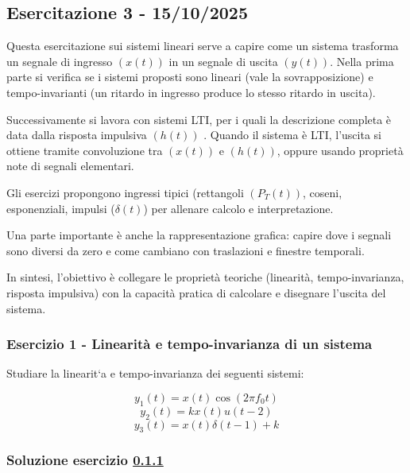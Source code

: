 \documentclass[../main.tex]{subfiles}
\begin{document}
\clearpage
\thispagestyle{empty}
\vspace*{7cm}
\subsection{Esercitazione 3 - 15/10/2025}
\vspace*{1.5cm}

Questa esercitazione sui sistemi lineari serve a capire come un sistema trasforma un segnale di ingresso $(x(t))$ in un segnale di uscita $(y(t))$. Nella prima parte si verifica se i sistemi proposti sono lineari (vale la sovrapposizione) e tempo-invarianti (un ritardo in ingresso produce lo stesso ritardo in uscita).

Successivamente si lavora con sistemi LTI, per i quali la descrizione completa è data dalla risposta impulsiva $(h(t))$
.
Quando il sistema è LTI, l’uscita si ottiene tramite convoluzione tra $(x(t))$ e $(h(t))$, oppure usando proprietà note di segnali elementari.

Gli esercizi propongono ingressi tipici (rettangoli $(P_T(t))$, coseni, esponenziali, impulsi ($\delta(t)$) per allenare calcolo e interpretazione.

Una parte importante è anche la rappresentazione grafica: capire dove i segnali sono diversi da zero e come cambiano con traslazioni e finestre temporali.

In sintesi, l’obiettivo è collegare le proprietà teoriche (linearità, tempo-invarianza, risposta impulsiva) con la capacità pratica di calcolare e disegnare l’uscita del sistema.

\vspace*{1.5cm}
\subsubsection{Esercizio 1 - Linearità e tempo-invarianza di un sistema}
\label{ss31}

Studiare la linearit`a e tempo-invarianza dei seguenti sistemi:

\begin{equation*}
	y_1(t) = x(t) \cos(2\pi f_0 t)
\end{equation*}
\begin{equation*}
	y_2(t) = kx(t)u(t - 2)
\end{equation*}
\begin{equation*}
	y_3(t) = x(t) \delta(t-1) + k
\end{equation*}

\subsubsection*{Soluzione esercizio \ref{ss31}}
\end{document}
